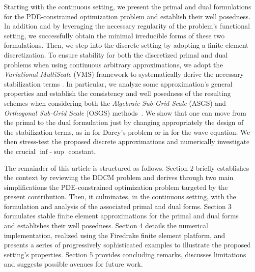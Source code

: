 Starting with the continuous setting, we present the primal and dual formulations for the PDE-constrained optimization problem and establish their well posedness. In addition and by leveraging the necessary regularity of the problem's functional setting, we successfully obtain the minimal irreducible forms of these two formulations. Then, we step into the discrete setting by adopting a finite element discretization. To ensure stability for both the discretized primal and dual problems when using continuous arbitrary approximations, we adopt the \textit{Variational MultiScale} (VMS) framework to systematically derive the necessary stabilization terms \cite{Hughes1995,Hughes1998,Codina2017}. In particular, we analyze some approximation's general properties and establish the consistency and well posedness of the resulting schemes when considering both the \textit{Algebraic Sub-Grid Scale} (ASGS) and \textit{Orthogonal Sub-Grid Scale} (OSGS) methods~\cite{codina2000, codina2002}. We show that one can move from the primal to the dual formulation just by changing appropriately the design of the stabilization terms, as in \cite{Badia2009} for Darcy's problem or in \cite{Badia2014} for the wave equation. We then stress-test the proposed discrete approximations and numerically investigate the crucial $\inf$-$\sup$ constant.  

The remainder of this article is structured as follows. Section 2 briefly establishes the context by reviewing the DDCM problem and derives through two main simplifications the PDE-constrained optimization problem targeted by the present contribution. Then, it culminates, in the continuous setting, with the formulation and analysis of the associated primal and dual forms. Section 3 formulates stable finite element approximations for the primal and dual forms and establishes their well posedness. Section 4 details the numerical implementation, realized using the Firedrake finite element platform, and presents a series of progressively sophisticated examples to illustrate the proposed setting's properties. Section 5 provides concluding remarks, discusses limitations and suggests possible avenues for future work.
